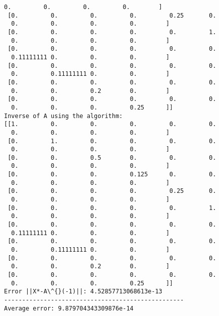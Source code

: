 \documentclass[11pt]{article}
\begin{document}
\begin{Verbatim}[commandchars=\\\{\}]
  0.         0.         0.         0.        ]
 [0.         0.         0.         0.         0.25       0.
  0.         0.         0.         0.        ]
 [0.         0.         0.         0.         0.         1.
  0.         0.         0.         0.        ]
 [0.         0.         0.         0.         0.         0.
  0.11111111 0.         0.         0.        ]
 [0.         0.         0.         0.         0.         0.
  0.         0.11111111 0.         0.        ]
 [0.         0.         0.         0.         0.         0.
  0.         0.         0.2        0.        ]
 [0.         0.         0.         0.         0.         0.
  0.         0.         0.         0.25      ]]
Inverse of A using the algorithm:
[[1.         0.         0.         0.         0.         0.
  0.         0.         0.         0.        ]
 [0.         1.         0.         0.         0.         0.
  0.         0.         0.         0.        ]
 [0.         0.         0.5        0.         0.         0.
  0.         0.         0.         0.        ]
 [0.         0.         0.         0.125      0.         0.
  0.         0.         0.         0.        ]
 [0.         0.         0.         0.         0.25       0.
  0.         0.         0.         0.        ]
 [0.         0.         0.         0.         0.         1.
  0.         0.         0.         0.        ]
 [0.         0.         0.         0.         0.         0.
  0.11111111 0.         0.         0.        ]
 [0.         0.         0.         0.         0.         0.
  0.         0.11111111 0.         0.        ]
 [0.         0.         0.         0.         0.         0.
  0.         0.         0.2        0.        ]
 [0.         0.         0.         0.         0.         0.
  0.         0.         0.         0.25      ]]
Error ||X*-A\^{}(-1)||: 4.52857713068613e-13
--------------------------------------------------
Average error: 9.879704343309876e-14
    \end{Verbatim}


    
    
    
\end{document}

